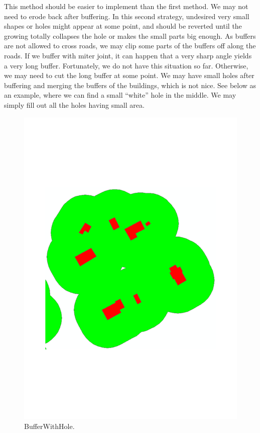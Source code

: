 \documentclass[graybox]{svmult}
\begin{document}
This method should be easier to implement than the first method.
We may not need to erode back after buffering. In this second 
strategy, undesired very small shapes or holes might appear at 
some point, and should be reverted until the growing totally 
collapses the hole or makes the small parts big enough. As 
buffers are not allowed to cross roads, we may clip some parts 
of the buffers off along the roads.
If we buffer with miter joint, it can happen that a very sharp 
angle yields a very long buffer. Fortunately, we do not have 
this situation so far. Otherwise, we may need to cut the long 
buffer at some point.
We may have small holes after buffering and merging the buffers 
of the buildings, which is not nice. See below as an example, 
where we can find a small “white” hole in the middle. We may 
simply fill out all the holes having small area.

\begin{figure}[tb]
	\centering
	\includegraphics[width=\linewidth/2]{BufferWithHole}
	\caption{BufferWithHole.}
	\label{fig:BufferWithHole}
\end{figure}
\end{document}
